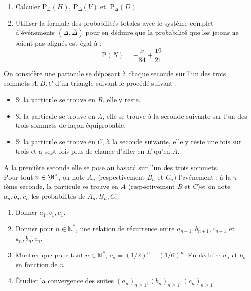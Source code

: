 \documentclass[a4paper,10pt]{report}
\begin{document}
\begin{Exercice}{}
\begin{enumerate}
\begin{enumerate}
\item Calculer $\mathrm{P}_{\Delta
}\left( H\right) ,\ \mathrm{P}_{\Delta}\left( V\right)$ et $\ \mathrm{P}%
_{\Delta}\left( D\right)$.

\item Utiliser la formule des probabilit\'{e}s totales avec le syst\`{e}me
complet d'\'{e}v\'{e}nements $\left( \Delta,\overline{\Delta}\right) $ pour
en d\'{e}duire que la probabilit\'{e} que les jetons ne soient pas align\'{e}s
est \'{e}gal \`{a} $:$%
\begin{equation*}
\mathrm{P}\left( N\right) =-\frac{x}{84}+\frac{19}{21}
\end{equation*}
\end{enumerate}
\end{enumerate}
\end{Exercice}




\begin{Exercice}{} On considère une particule se déposant à chaque seconde sur l'un des trois sommets $A,B,C$ d'un triangle suivant le procédé suivant :

\vspace{0.3cm}

\begin{itemize}
 \item Si la particule se trouve en $B$, elle y reste.
 \item Si la particule se trouve en $A$, elle se trouve à la seconde suivante sur l'un des trois sommets de façon équiprobable.
 \item Si la particule se trouve en $C$, à la seconde suivante, elle y reste une fois sur trois et a sept fois plus de chance d'aller en $B$ qu'en $A$.
\end{itemize}

\vspace{0.3cm}

\noindent A la première seconde elle se pose au hasard sur l'un des trois sommets.\\
Pour tout $n\in \N^*$, on note $A_n$ (respectivement $B_n$ et $C_n$) l'événement : \og à la $n$-ième seconde, la particule se trouve en $A$ (respectivement $B$ et $C$)\fg et on note $a_n, b_n, c_n$ les probabilités de $A_n, B_n, C_n$.

\vspace{0.3cm}

\begin{enumerate}
 \item Donner $a_1, b_1, c_1$.
 \item Donner pour $n \in \mathbb{N}^*$, une relation de récurrence entre $a_{n+1}, b_{n+1}, c_{n+1}$ et $a_n, b_n, c_n$.
 \item Montrer que pour tout $n \in \mathbb{N}^*$, $c_n = (1/2)^n-(1/6)^n$. En déduire $a_n$ et $b_n$ en fonction de $n$.
 \item Étudier la convergence des suites $(a_n)_{n \geq 1}, (b_n)_{n \geq 1}, (c_n)_{n \geq 1}$.
\end{enumerate}
\end{Exercice}
\end{document}

